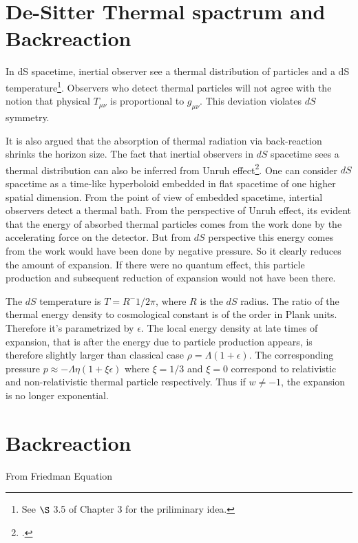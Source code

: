 \section{De-Sitter Thermal spactrum and Backreaction}

In dS spacetime, inertial observer see a thermal distribution of particles and a dS temperature\footnote{See $\S$ 3.5 of Chapter 3 for the priliminary idea.}. Observers who detect thermal particles will not agree with the notion that physical $T_{\mu\nu}$ is proportional to $g_{\mu\nu}$. This deviation violates $dS$ symmetry. \par

It is also argued\autocite{hawking:1977} that the absorption of thermal radiation via back-reaction shrinks the horizon size. The fact that inertial observers in $dS$ spacetime sees a thermal distribution can also be inferred from Unruh effect\footcite{unruh:1976}. One can consider $dS$ spacetime as a time-like hyperboloid embedded in flat spacetime of one higher spatial dimension. From the point of view of embedded spacetime, intertial observers detect a thermal bath. From the perspective of Unruh effect, its evident that the energy of absorbed thermal particles comes from the work done by the accelerating force on the detector. But from $dS$ perspective this energy comes from the work would have been done by negative pressure. So it clearly reduces the amount of expansion. If there were no quantum effect, this particle production and subsequent reduction of expansion would not have been there. \par

The $dS$ temperature is $T=R^-1/2\pi $, where $R$ is the $dS$ radius. The ratio of the thermal energy density to cosmological constant is of the order in Plank units. Therefore it's parametrized by $\epsilon$. The local energy density at late times of expansion, that is after the energy due to particle production appears, is therefore slightly larger than classical case $\rho = \Lambda (1+\epsilon)$. The corresponding pressure $p \approx -\Lambda\eta(1+\xi\epsilon)$ where $\xi=1/3$ and $\xi=0$ correspond to relativistic and non-relativistic thermal particle respectively. Thus if $w\ne -1$, the expansion is no longer exponential. \par

\section{Backreaction}
From Friedman Equation 

